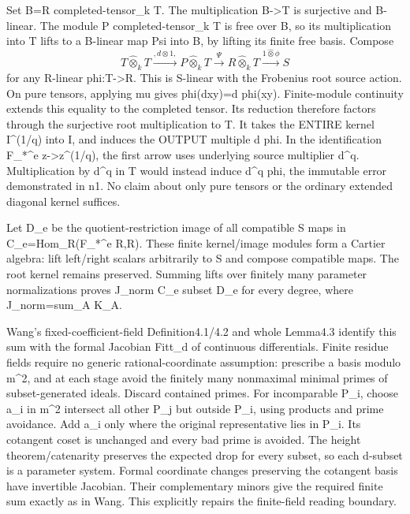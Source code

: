 \documentclass[11pt]{article}
\begin{document}
Set B=R completed-tensor\_k T. The multiplication B->T is surjective and B-linear. The module P completed-tensor\_k T is free over B, so its multiplication into T lifts to a B-linear map Psi into B, by lifting its finite free basis. Compose
\[
T\widehat\otimes_k T\xrightarrow{,d\otimes1,}
P\widehat\otimes_k T\xrightarrow{\Psi}
R\widehat\otimes_k T\xrightarrow{1\widehat\otimes\phi}S
\]
for any R-linear phi:T->R. This is S-linear with the Frobenius root source action. On pure tensors, applying mu gives phi(dxy)=d phi(xy). Finite-module continuity extends this equality to the completed tensor. Its reduction therefore factors through the surjective root multiplication to T. It takes the ENTIRE kernel I\textasciicircum{}(1/q) into I, and induces the OUTPUT multiple d phi. In the identification F\_*\textasciicircum{}e z->z\textasciicircum{}(1/q), the first arrow uses underlying source multiplier d\textasciicircum{}q. Multiplication by d\textasciicircum{}q in T would instead induce d\textasciicircum{}q phi, the immutable error demonstrated in n1. No claim about only pure tensors or the ordinary extended diagonal kernel suffices.

Let D\_e be the quotient-restriction image of all compatible S maps in C\_e=Hom\_R(F\_*\textasciicircum{}e R,R). These finite kernel/image modules form a Cartier algebra: lift left/right scalars arbitrarily to S and compose compatible maps. The root kernel remains preserved. Summing lifts over finitely many parameter normalizations proves J\_norm C\_e subset D\_e for every degree, where J\_norm=sum\_A K\_A.

Wang's fixed-coefficient-field Definition4.1/4.2 and whole Lemma4.3 identify this sum with the formal Jacobian Fitt\_d of continuous differentials. Finite residue fields require no generic rational-coordinate assumption: prescribe a basis modulo m\textasciicircum{}2, and at each stage avoid the finitely many nonmaximal minimal primes of subset-generated ideals. Discard contained primes. For incomparable P\_i, choose a\_i in m\textasciicircum{}2 intersect all other P\_j but outside P\_i, using products and prime avoidance. Add a\_i only where the original representative lies in P\_i. Its cotangent coset is unchanged and every bad prime is avoided. The height theorem/catenarity preserves the expected drop for every subset, so each d-subset is a parameter system. Formal coordinate changes preserving the cotangent basis have invertible Jacobian. Their complementary minors give the required finite sum exactly as in Wang. This explicitly repairs the finite-field reading boundary.
\end{document}
